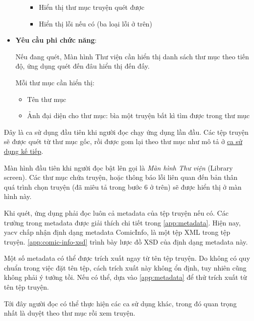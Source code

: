 \documentclass[../../thesis]{subfiles}
\begin{document}
\begin{itemize}
\begin{itemize}
                \begin{itemize}
                    \item
                        Hiển thị thư mục truyện quét được
                    \item
                        Hiển thị lỗi nếu có (ba loại lỗi ở trên)
                \end{itemize}
          \end{itemize}
    \item
        \textbf{Yêu cầu phi chức năng}:

        Nếu đang quét, Màn hình Thư viện cần hiển thị danh sách thư mục theo
        tiến độ, ứng dụng quét đến đâu hiển thị đến đấy.

        Mỗi thư mục cần hiển thị:

        \begin{itemize}
            \item
                Tên thư mục
            \item
                Ảnh đại diện cho thư mục: bìa một truyện bất kì tìm được trong
                thư mục
        \end{itemize}
\end{itemize}

Đây là ca sử dụng đầu tiên khi người đọc chạy ứng dụng lần đầu. Các tệp truyện
sẽ được quét từ thư mục gốc, rồi được gom lại theo thư mục như mô tả ở
\hyperref[sec:show-library]{ca sử dụng kế tiếp}.

Màn hình đầu tiên khi người đọc bật lên gọi là \emph{Màn hình Thư viện} (Library
screen). Các thư mục chứa truyện, hoặc thông báo lỗi liên quan đến bản thân quá
trình chọn truyện (đã miêu tả trong bước 6 ở trên) sẽ được hiển thị ở màn hình
này.

Khi quét, ứng dụng phải đọc luôn cả metadata của tệp truyện nếu có. Các trường
trong metadata được giải thích chi tiết trong \autoref{app:metadata}. Hiện nay,
yacv chấp nhận định dạng metadata ComicInfo, là một tệp XML trong tệp truyện.
\autoref{app:comic-info-xsd} trình bày lược đồ XSD của định dạng metadata này.

Một số metadata có thể được trích xuất ngay từ tên tệp truyện. Do không có quy
chuẩn trong việc đặt tên tệp, cách trích xuất này không ổn định, tuy nhiên cũng
không phải ý tưởng tồi. Nếu có thể, dựa vào \autoref{app:metadata} để thử trích
xuất từ tên tệp truyện.

Tới đây người đọc có thể thực hiện các ca sử dụng khác, trong đó quan trọng nhất
là duyệt theo thư mục rồi xem truyện.
\end{document}
